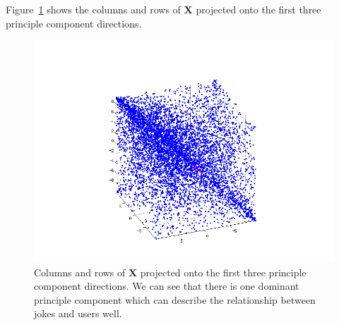 \documentclass{article}
\begin{document}
\begin{homeworkProblem}
   
    Figure~\ref{fig:prob5} shows the columns and rows of $\bm{X}$ projected
    onto the first three principle component directions. 

    \begin{figure}[!ht]
        
        \includegraphics[width=\linewidth]{prob5_fig.png}

        \caption{\label{fig:prob5} Columns and rows of $\bm{X}$ projected onto
        the first three principle component directions. We can see that there
    is one dominant principle component which can describe the relationship
between jokes and users well.}

    \end{figure}


\end{homeworkProblem}
\end{document}
